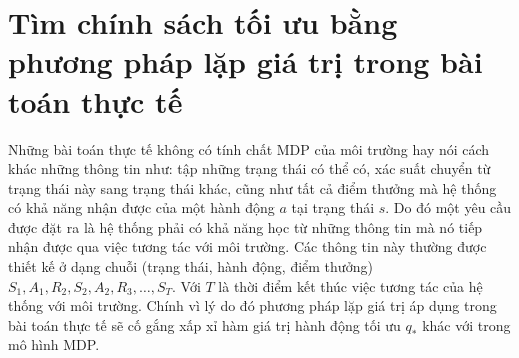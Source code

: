 \section{Tìm chính sách tối ưu bằng phương pháp lặp giá trị trong bài toán thực tế}
Những bài toán thực tế không có tính chất MDP của môi trường hay nói cách khác những thông tin như: tập những trạng thái có thể có, xác suất chuyển từ trạng thái này sang trạng thái khác, cũng như tất cả điểm thưởng mà hệ thống có khả năng nhận được của một hành động $a$ tại trạng thái $s$. Do đó một yêu cầu được đặt ra là hệ thống phải có khả năng học từ những thông tin mà nó tiếp nhận được qua việc tương tác với môi trường. Các thông tin này thường được thiết kế ở dạng chuỗi (trạng thái, hành động, điểm thưởng)
$\mathit{S}_1, \mathit{A}_1, \mathit{R}_2, \mathit{S}_2, \mathit{A}_2, \mathit{R}_3, \dots, \mathit{S}_T$. Với $T$ là thời điểm kết thúc việc tương tác của hệ thống với môi trường. Chính vì lý do đó phương pháp lặp giá trị áp dụng trong bài toán thực tế sẽ cố gắng xấp xỉ hàm giá trị hành động tối ưu $q_{*}$ khác với trong mô hình MDP.

